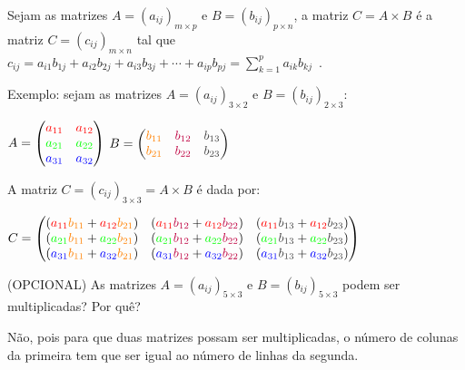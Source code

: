 \documentclass[pdftex, brazil, 12pt, oneside, addpoints]{exam}
\begin{document}
\begin{questions}
\begin{solution}
  Sejam as matrizes $A = (a_{ij})_{m \times p}$ e $B = (b_{ij})_{p \times n}$, a matriz $C = A \times B$
  é a matriz $C = (c_{ij})_{m \times n}$ tal que $c_{ij} = a_{i1}b_{1j} + a_{i2}b_{2j} + a_{i3}b_{3j} + \cdots + a_{ip}b_{pj} = \sum_{k=1}^{p} a_{ik}b_{kj}$\ .

  Exemplo: sejam as matrizes $A = (a_{ij})_{3 \times 2}$ e $B = (b_{ij})_{2 \times 3}$:

  \hspace{2cm}$A = \begin{pmatrix}
    \color{red}a_{11} & \color{red}a_{12}\\
    \color{green}a_{21} & \color{green}a_{22}\\
    \color{blue}a_{31} & \color{blue}a_{32}
  \end{pmatrix}$
  \hspace{2cm}$B = \begin{pmatrix}
    \color{orange}b_{11} & \color{purple}b_{12} & \color{darkgray}b_{13}\\
    \color{orange}b_{21} & \color{purple}b_{22} & \color{darkgray}b_{23}
  \end{pmatrix}$

  A matriz $C = (c_{ij})_{3 \times 3} = A \times B$ é
  dada por:

  $C = \begin{pmatrix}
    ({\color{red}a_{11}}{\color{orange}b_{11}} + {\color{red}a_{12}}{\color{orange}b_{21}}) & ({\color{red}a_{11}}{\color{purple}b_{12}} + {\color{red}a_{12}}{\color{purple}b_{22}}) & ({\color{red}a_{11}}{\color{darkgray}b_{13}} + {\color{red}a_{12}}{\color{darkgray}b_{23}})\\
    ({\color{green}a_{21}}{\color{orange}b_{11}} + {\color{green}a_{22}}{\color{orange}b_{21}}) & ({\color{green}a_{21}}{\color{purple}b_{12}} + {\color{green}a_{22}}{\color{purple}b_{22}}) & ({\color{green}a_{21}}{\color{darkgray}b_{13}} + {\color{green}a_{22}}{\color{darkgray}b_{23}})\\
    ({\color{blue}a_{31}}{\color{orange}b_{11}} + {\color{blue}a_{32}}{\color{orange}b_{21}}) & ({\color{blue}a_{31}}{\color{purple}b_{12}} + {\color{blue}a_{32}}{\color{purple}b_{22}}) & ({\color{blue}a_{31}}{\color{darkgray}b_{13}} + {\color{blue}a_{32}}{\color{darkgray}b_{23}})
\end{pmatrix}$
\end{solution}

\question
(OPCIONAL) As matrizes $A = (a_{ij})_{5 \times 3}$ e $B = (b_{ij})_{5 \times 3}$ podem ser multiplicadas?
Por quê?
\begin{solution}
  Não, pois para que duas matrizes possam ser multiplicadas, o número de colunas da primeira
  tem que ser igual ao número de linhas da segunda.
\end{solution}


\end{questions}
\end{document}
